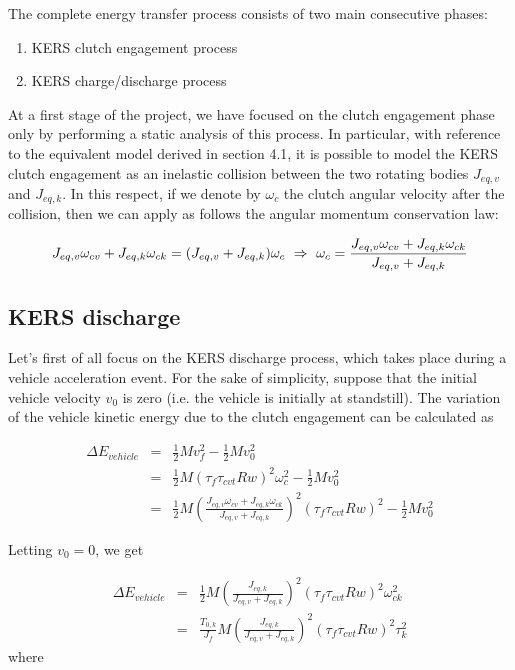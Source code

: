 \documentclass[11pt]{article}
\begin{document}
The complete energy transfer process consists of two main consecutive phases:

\begin{enumerate}
\item KERS clutch engagement process
\item KERS charge/discharge process
\end{enumerate}

At a first stage of the project, we have focused on the clutch engagement phase only by performing a static analysis of this process. In particular, with reference to the equivalent model derived in section 4.1, it is possible to model the KERS clutch engagement as an inelastic collision between the two rotating bodies $J_{eq,v}$ and $J_{eq,k}$. In this respect, if we denote by $\omega_c$ the clutch angular velocity after the collision, then we can apply as follows the angular momentum conservation law:

\begin{equation}
J_{eq,v}\omega_{cv}+J_{eq,k}\omega_{ck}=(J_{eq,v}+J_{eq,k})\omega_c\ \Rightarrow\ \omega_c= \frac{J_{eq,v}\omega_{cv}+J_{eq,k}\omega_{ck}}{J_{eq,v}+J_{eq,k}}\\
\end{equation}  

\subsection{KERS discharge}

Let's first of all focus on the KERS discharge process, which takes place during a vehicle acceleration event. For the sake of simplicity, suppose that the initial vehicle velocity $v_0$ is zero (i.e. the vehicle is initially at standstill). The variation of the vehicle kinetic energy due to the clutch engagement can be calculated as

\begin{eqnarray}
	\Delta E_{vehicle}&=&\frac{1}{2}Mv_f^2-\frac{1}{2}Mv_0^2\\
	                  &=&\frac{1}{2}M(\tau_f \tau_{cvt}Rw)^2\omega_c^2-\frac{1}							  {2}Mv_0^2\\
	                  &=&\frac{1}{2}M\left(\frac{J_{eq,v}\omega_{cv}+J_{eq,k}       					  \omega_{ck}}{J_{eq,v}+J_{eq,k}}\right)^2(\tau_f \tau_{cvt}						  Rw)^2-\frac{1}{2}Mv_0^2
\end{eqnarray}  

Letting $v_0=0$, we get

\begin{eqnarray}
\Delta E_{vehicle}&=&\frac{1}{2}M\left(\frac{J_{eq,k}}{J_{eq,v}+J_{eq,k}}								 \right)^2(\tau_f \tau_{cvt}Rw)^2\omega_{ck}^2\\
                  &=&\frac{T_{0,k}}{J_f}M\left(\frac{J_{eq,k}}{J_{eq,v}+J_{eq,k}}					     \right)^2(\tau_f \tau_{cvt}Rw)^2 \tau_k^2
\label{energy_vehicle}
\end{eqnarray}
where
\end{document}
